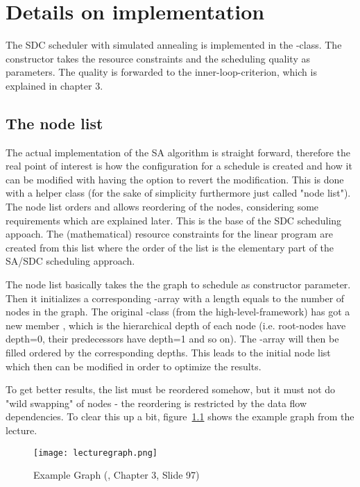 \chapter{Details on implementation}

The SDC scheduler with simulated annealing is implemented in the -class. The constructor takes the resource constraints and the scheduling quality as parameters. The quality is forwarded to the inner-loop-criterion, which is explained in chapter 3.\par

\section{The node list}
The actual implementation of the SA algorithm is straight forward, therefore the real point of interest is how the configuration for a schedule is created and how it can be modified with having the option to revert the modification. This is done with a helper class  (for the sake of simplicity furthermore just called "node list"). The node list orders and allows reordering of the nodes, considering some requirements which are explained later. This is the base of the SDC scheduling appoach. The (mathematical) resource constraints for the linear program are created from this list where the order of the list is the elementary part of the SA/SDC scheduling approach.\par
The node list basically takes the the graph to schedule as constructor parameter. Then it initializes a corresponding -array with a length equals to the number of nodes in the graph. The original -class (from the high-level-framework) has got a new member , which is the hierarchical depth of each node (i.e. root-nodes have depth=0, their predecessors have depth=1 and so on). The -array will then be filled ordered by the corresponding depths. This leads to the initial node list which then can be modified in order to optimize the results.\par
To get better results, the list must be reordered somehow, but it must not do "wild swapping" of nodes - the reordering is restricted by the data flow dependencies. To clear this up a bit, figure~\ref{fig:lecturegraph} shows the example graph from the lecture.
\begin{figure}
	\centering
	\texttt{[image: lecturegraph.png]}
	\caption{Example Graph (\cite{Hochberger2017}, Chapter 3, Slide 97)}
	\label{fig:lecturegraph}
\end{figure}

